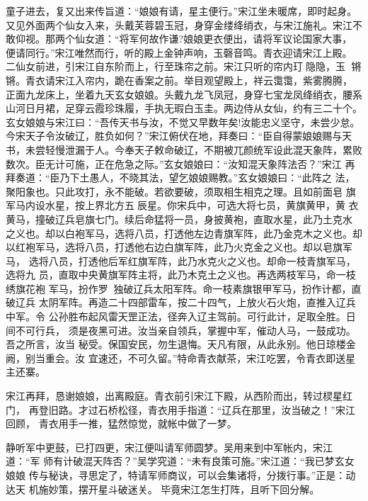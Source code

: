 童子进去，复又出来传旨道：“娘娘有请，星主便行。”宋江坐未暖席，即时起身。
又见外面两个仙女入来，头戴芙蓉碧玉冠，身穿金缕绛绡衣，与宋江施礼。宋江不
敢仰视。那两个仙女道：“将军何故作谦?娘娘更衣便出，请将军议论国家大事，
便请同行。”宋江唯然而行，听的殿上金钟声响，玉磬音鸣。青衣迎请宋江上殿。
二仙女前进，引宋江自东阶而上，行至珠帘之前。宋江只听的帘内玎隐隐，玉
锵锵。青衣请宋江入帘内，跪在香案之前。举目观望殿上，祥云霭霭，紫雾腾腾，
正面九龙床上，坐着九天玄女娘娘。头戴九龙飞凤冠，身穿七宝龙凤绛绡衣，腰系
山河日月裙，足穿云霞珍珠履，手执无瑕白玉圭。两边侍从女仙，约有三二十个。
玄女娘娘与宋江曰：“吾传天书与汝，不觉又早数年矣!汝能忠义坚守，未尝少怠。
今宋天子令汝破辽，胜负如何？”宋江俯伏在地，拜奏曰：“臣自得蒙娘娘赐与天
书，未尝轻慢泄漏于人。今奉天子敕命破辽，不期被兀颜统军设此混天象阵，累败
数次。臣无计可施，正在危急之际。”玄女娘娘曰：“汝知混天象阵法否？”宋江
再拜奏道：“臣乃下土愚人，不晓其法，望乞娘娘赐教。”玄女娘娘曰：“此阵之
法，聚阳象也。只此攻打，永不能破。若欲要破，须取相生相克之理。且如前面皂
旗军马内设水星，按上界北方五辰星。你宋兵中，可选大将七员，黄旗黄甲，黄
衣黄马，撞破辽兵皂旗七门。续后命猛将一员，身披黄袍，直取水星，此乃土克水
之义也。却以白袍军马，选将八员，打透他左边青旗军阵，此乃金克木之义也。却
以红袍军马，选将八员，打透他右边白旗军阵，此乃火克金之义也。却以皂旗军马，
选将八员，打透他后军红旗军阵，此乃水克火之义也。却命一枝青旗军马，选将九
员，直取中央黄旗军阵主将，此乃木克土之义也。再选两枝军马，命一枝绣旗花袍
军马，扮作罗，独破辽兵太阳军阵。命一枝素旗银甲军马，扮作计都，直破辽兵
太阴军阵。再造二十四部雷车，按二十四气，上放火石火炮，直推入辽兵中军。令
公孙胜布起风雷天罡正法，径奔入辽主驾前。可行此计，足取全胜。日间不可行兵，
须是夜黑可进。汝当亲自领兵，掌握中军，催动人马，一鼓成功。吾之所言，汝当
秘受。保国安民，勿生退悔。天凡有限，从此永别。他日琼楼金阙，别当重会。汝
宜速还，不可久留。”特命青衣献茶，宋江吃罢，令青衣即送星主还寨。

宋江再拜，恳谢娘娘，出离殿庭。青衣前引宋江下殿，从西阶而出，转过棂星红门，
再登旧路。才过石桥松径，青衣用手指道：“辽兵在那里，汝当破之！”宋江回顾，
青衣用手一推，猛然惊觉，就帐中做了一梦。

静听军中更鼓，已打四更，宋江便叫请军师圆梦。吴用来到中军帐内，宋江道：“军
师有计破混天阵否？”吴学究道：“未有良策可施。”宋江道：“我已梦玄女娘娘
传与秘诀，寻思定了，特请军师商议，可以会集诸将，分拨行事。”正是：动达天
机施妙策，摆开星斗破迷关。
毕竟宋江怎生打阵，且听下回分解。
